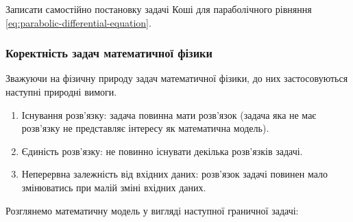 \begin{exercise}
    Записати самостійно постановку задачі Коші для параболічного рівняння \eqref{eq:parabolic-differential-equation}.
\end{exercise}

\subsubsection{Коректність задач математичної фізики}

Зважуючи на фізичну природу задач математичної фізики, до них застосовуються наступні природні вимоги.
\begin{enumerate}
    \item Існування розв'язку: задача повинна мати розв'язок (задача яка не має розв'язку не представляє інтересу як математична модель).
    \item Єдиність розв’язку: не повинно існувати декілька розв'язків задачі.
    \item Неперервна залежність від вхідних даних: розв'язок задачі повинен мало змінюватись при малій зміні вхідних даних.
\end{enumerate}

Розглянемо математичну модель у вигляді наступної граничної задачі:


\newpage 

